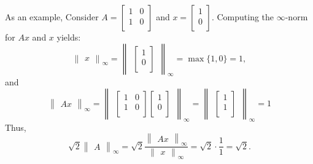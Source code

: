 \documentclass{article}
\begin{document}
As an example, Consider 
$A = 
\begin{bmatrix}
    1 & 0\\
    1 & 0\\
\end{bmatrix} $
 and
 $x = \begin{bmatrix}
    1\\
    0\\
 \end{bmatrix}$. Computing the $\infty$-norm for $Ax$ and $x$ yields:
 \[ 
    \begin{Vmatrix}
        x
    \end{Vmatrix}_\infty
    =
    \begin{Vmatrix}
        \begin{bmatrix}
            1\\
            0\\
        \end{bmatrix}
    \end{Vmatrix}_\infty
    = \max \{1, 0\}
    = 1,
 \]
 and
 \[
    \begin{Vmatrix}
        Ax
    \end{Vmatrix}_\infty
    =
    \begin{Vmatrix}
        \begin{bmatrix}
            1 & 0\\
            1 & 0\\
        \end{bmatrix}
        \begin{bmatrix}
            1\\
            0\\
        \end{bmatrix}
    \end{Vmatrix}_\infty
    =
    \begin{Vmatrix}
        \begin{bmatrix}
            1\\
            1\\
        \end{bmatrix}
    \end{Vmatrix}_\infty
    =
    1
 \]
 Thus, 
 \[\sqrt{2}
    \begin{Vmatrix}
        A
    \end{Vmatrix}_\infty
    =
    \sqrt{2}
    \frac{
            \begin{Vmatrix}
                Ax
            \end{Vmatrix}_{\infty}
        }{
            \begin{Vmatrix}
                x
            \end{Vmatrix}_{\infty}
        } 
    =
    \sqrt{2}\cdot
    \frac{1}{1} = \sqrt{2}.
\]
\end{document}
